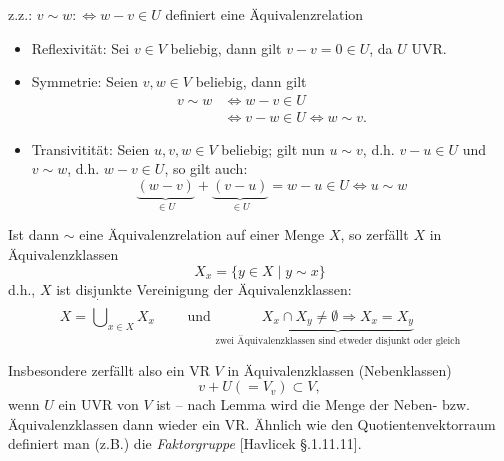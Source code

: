  	z.z.: $ v\sim w:\Leftrightarrow w-v\in U $ definiert eine Äquivalenzrelation

 	\begin{itemize}
 		\item Reflexivität: Sei $ v\in V $ beliebig, dann gilt $ v-v=0\in U $, da $ U $ UVR.
 		\item Symmetrie: Seien $ v,w\in V $ beliebig, dann gilt
 		      \begin{align*}
 		      	v\sim w & \Leftrightarrow w-v\in U                          \\
 		      	        & \Leftrightarrow v-w\in U \Leftrightarrow w\sim v.
 		      \end{align*}
 		\item Transivitität: Seien $ u,v,w\in V $ beliebig; gilt nun
 		      $u\sim v$, d.h. $v-u\in U$ und $v\sim w$, d.h. $w-v\in U$, so gilt auch:
 		      \[
 		      	\underbrace{(w-v)}_{\in U}+\underbrace{(v-u)}_{\in U}= w-u\in U \Leftrightarrow u\sim w
 		      \]
 	\end{itemize}

 	Ist dann $ \sim $ eine Äquivalenzrelation auf einer Menge $ X $, so zerfällt $ X $ in Äquivalenzklassen
 	\[
 		X_x = \{y\in X\mid y\sim x\}
 	\]
 	d.h., $ X $ ist disjunkte Vereinigung der Äquivalenzklassen:
 	\[
 		X = \dot{\bigcup}_{x\in X}X_x \qquad\text{ und } \underbrace{X_x \cap X_y \neq \emptyset \Rightarrow X_x = X_y}_{\text{zwei Äquivalenzklassen sind etweder disjunkt oder gleich}}
 	\]

 	Insbesondere zerfällt also ein VR $ V $ in Äquivalenzklassen (Nebenklassen)
 	\[
 		v+U (= V_v)\subset V,
 	\]
 	wenn $ U $ ein UVR von $ V $ ist -- nach Lemma wird die Menge der Neben- bzw. Äquivalenzklassen dann wieder ein VR. Ähnlich wie den Quotientenvektorraum definiert man (z.B.) die \emph{Faktorgruppe} [Havlicek §.1.11.11].

